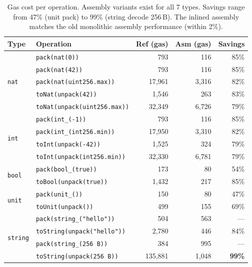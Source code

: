 \documentclass[11pt,a4paper]{article}
\begin{document}
\begin{table}[h]
\centering
\caption{Gas cost per operation. Assembly variants exist for all 7 types.
Savings range from 47\% (unit pack) to 99\% (string decode 256\,B).
The inlined assembly matches the old monolithic assembly performance (within 2\%).}
\label{tab:gas}
\small
\begin{tabular}{@{}llrrr@{}}
\toprule
\textbf{Type} & \textbf{Operation} & \textbf{Ref (gas)} & \textbf{Asm (gas)} & \textbf{Savings} \\
\midrule
\multirow{5}{*}{\texttt{nat}}
  & \texttt{pack(nat(0))}            & 793     & 116    & 85\% \\
  & \texttt{pack(nat(42))}           & 793     & 116    & 85\% \\
  & \texttt{pack(nat(uint256.max))}  & 17{,}961 & 3{,}316 & 82\% \\
  & \texttt{toNat(unpack(42))}         & 1{,}546 & 263    & 83\% \\
  & \texttt{toNat(unpack(uint256.max))} & 32{,}349 & 6{,}726 & 79\% \\
\midrule
\multirow{4}{*}{\texttt{int}}
  & \texttt{pack(int\_(-1))}           & 793     & 116    & 85\% \\
  & \texttt{pack(int\_(int256.min))}   & 17{,}950 & 3{,}310 & 82\% \\
  & \texttt{toInt(unpack(-42))}        & 1{,}525 & 324    & 79\% \\
  & \texttt{toInt(unpack(int256.min))} & 32{,}330 & 6{,}781 & 79\% \\
\midrule
\multirow{2}{*}{\texttt{bool}}
  & \texttt{pack(bool\_(true))}        & 173     & 80     & 54\% \\
  & \texttt{toBool(unpack(true))}      & 1{,}432 & 217    & 85\% \\
\midrule
\multirow{2}{*}{\texttt{unit}}
  & \texttt{pack(unit\_())}            & 150     & 80     & 47\% \\
  & \texttt{toUnit(unpack())}          & 499     & 155    & 69\% \\
\midrule
\multirow{4}{*}{\texttt{string}}
  & \texttt{pack(string\_("hello"))}   & 504     & 563    & ---  \\
  & \texttt{toString(unpack("hello"))} & 2{,}780 & 446    & 84\% \\
  & \texttt{pack(string\_(256\,B))}    & 384     & 995    & ---  \\
  & \texttt{toString(unpack(256\,B))}  & 135{,}881 & 1{,}048 & \textbf{99\%} \\

\end{tabular}
\end{table}
\end{document}
